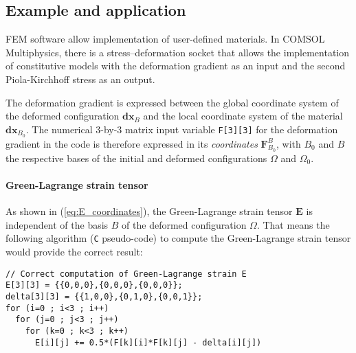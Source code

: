 \documentclass[letterpaper,12pt,oneside]{report}
\begin{document}
\subsection{Example and application}

FEM software allow implementation of user-defined materials. In COMSOL Multiphysics, there is a stress--deformation socket that allows the implementation of constitutive models with the deformation gradient as an input and the second Piola-Kirchhoff stress as an output.

The deformation gradient is expressed between the global coordinate system of the deformed configuration $\mathbf{dx}_B$ and the local coordinate system of the material $\mathbf{dx}_{B_0}$. The numerical 3-by-3 matrix input variable \texttt{F[3][3]} for the deformation gradient in the code is therefore expressed in its \emph{coordinates} $\mathbf{F}_{B_0}^B$, with $B_0$ and $B$ the respective bases of the initial and deformed configurations $\Omega$ and $\Omega_0$.

\paragraph{Green-Lagrange strain tensor} As shown in (\ref{eq:E_coordinates}), the Green-Lagrange strain tensor $\mathbf{E}$ is independent of the basis $B$ of the deformed configuration $\Omega$. That means the following algorithm (\texttt{C} pseudo-code) to compute the Green-Lagrange strain tensor would provide the correct result:
\begin{verbatim}
// Correct computation of Green-Lagrange strain E
E[3][3] = {{0,0,0},{0,0,0},{0,0,0}};
delta[3][3] = {{1,0,0},{0,1,0},{0,0,1}};
for (i=0 ; i<3 ; i++)
  for (j=0 ; j<3 ; j++)
    for (k=0 ; k<3 ; k++)
      E[i][j] += 0.5*(F[k][i]*F[k][j] - delta[i][j])
\end{verbatim}
\end{document}
